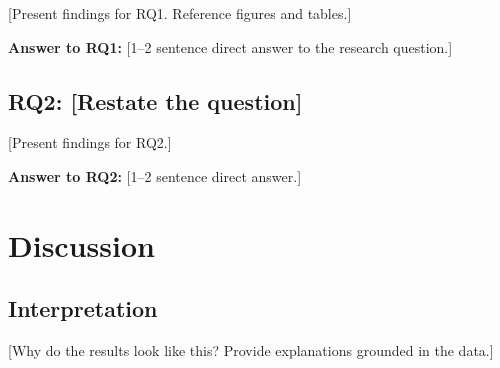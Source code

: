 \documentclass[11pt,a4paper]{article}
\begin{document}

[Present findings for RQ1. Reference figures and tables.]


\textbf{Answer to RQ1:} [1–2 sentence direct answer to the research question.]

\subsection{RQ2: [Restate the question]}
\label{sec:rq2}

[Present findings for RQ2.]

\textbf{Answer to RQ2:} [1–2 sentence direct answer.]


\section{Discussion}
\label{sec:discussion}

\subsection{Interpretation}

[Why do the results look like this? Provide explanations grounded in the data.]
\end{document}
